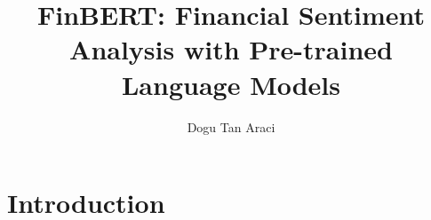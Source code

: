 \documentclass[sigconf]{acmart}
\begin{document}
\title{FinBERT: Financial Sentiment Analysis with Pre-trained Language Models}
\author{Dogu Tan Araci}

\begin{abstract}
    
    
    
\end{abstract}




\maketitle

\section{Introduction}

    
    
    
    
    
    
    






\end{document}

